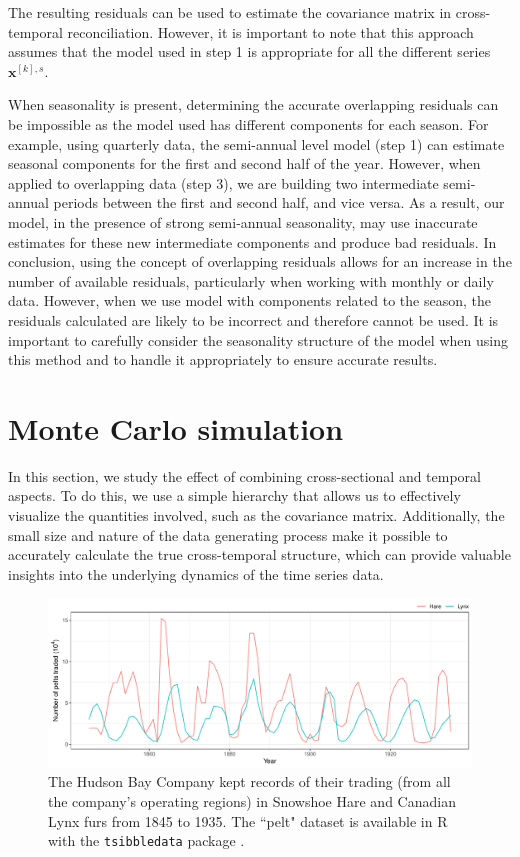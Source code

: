 \documentclass[a4paper,11pt]{article}
\newcommand{\xvet}{\bm{x}}
\theoremstyle{definition}
\begin{document}
The resulting residuals can be used to estimate the covariance matrix in cross-temporal reconciliation. However, it is important to note that this approach assumes that the model used in step 1 is appropriate for all the different series $\xvet^{[k], s}$.

When seasonality is present, determining the accurate overlapping residuals can be impossible as the model used has different components for each season. For example, using quarterly data, the semi-annual level model (step 1) can estimate seasonal components for the first and second half of the year. However, when applied to overlapping data (step 3), we are building two intermediate semi-annual periods between the first and second half, and vice versa. As a result, our model, in the presence of strong semi-annual seasonality, may use inaccurate estimates for these new intermediate components and produce bad residuals. In conclusion, using the concept of overlapping residuals allows for an increase in the number of available residuals, particularly when working with monthly or daily data. However, when we use model with components related to the season, the residuals calculated are likely to be incorrect and therefore cannot be used. It is important to carefully consider the seasonality structure of the model when using this method and to handle it appropriately to ensure accurate results.

\section{Monte Carlo simulation}\label{sec:mcsim}

In this section, we study the effect of combining cross-sectional and temporal aspects. To do this, we use a simple hierarchy that allows us to effectively visualize the quantities involved, such as the covariance matrix. Additionally, the small size and nature of the data generating process make it possible to accurately calculate the true cross-temporal structure, which can provide valuable insights into the underlying dynamics of the time series data.

\begin{figure}[!b]
	\centering
	\includegraphics[width = \linewidth]{fig/simAR/lynxhare.pdf}
	\caption{The Hudson Bay Company kept records of their trading (from all the company's operating regions) in Snowshoe Hare and Canadian Lynx furs from 1845 to 1935. The “pelt" dataset is available in \textsf{R} with the \texttt{tsibbledata} package \citep{ohara-wild2022}.}
	\label{fig:lynxhare}
\end{figure}
\end{document}

